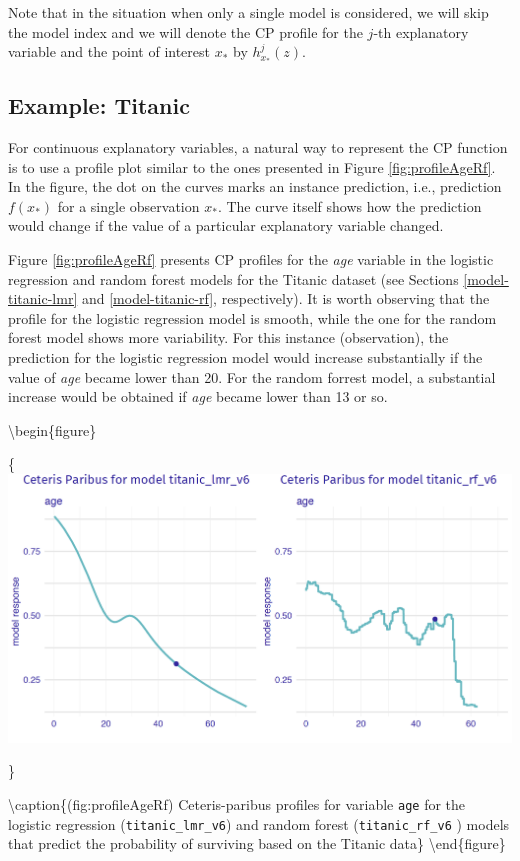 \documentclass[12pt,]{krantz}
\begin{document}
Note that in the situation when only a single model is considered, we will skip the model index and we will denote the CP profile for the \(j\)-th explanatory variable and the point of interest \(x_*\) by \(h^{j}_{x_*}(z)\).

\hypertarget{CPExample}{%
\subsection{Example: Titanic}\label{CPExample}}

For continuous explanatory variables, a natural way to represent the CP function is to use a profile plot similar to the ones presented in Figure \ref{fig:profileAgeRf}. In the figure, the dot on the curves marks an instance prediction, i.e., prediction \(f(x_*)\) for a single observation \(x_*\). The curve itself shows how the prediction would change if the value of a particular explanatory variable changed.

Figure \ref{fig:profileAgeRf} presents CP profiles for the \emph{age} variable in the logistic regression and random forest models for the Titanic dataset (see Sections \ref{model-titanic-lmr} and \ref{model-titanic-rf}, respectively). It is worth observing that the profile for the logistic regression model is smooth, while the one for the random forest model shows more variability. For this instance (observation), the prediction for the logistic regression model would increase substantially if the value of \emph{age} became lower than 20. For the random forrest model, a substantial increase would be obtained if \emph{age} became lower than 13 or so.

\textbackslash{}begin\{figure\}

\{\centering \includegraphics[width=0.7\linewidth]{figure/profile_age_rf}

\}

\textbackslash{}caption\{(fig:profileAgeRf) Ceteris-paribus profiles for variable \texttt{age} for the logistic regression (\texttt{titanic\_lmr\_v6}) and random forest (\texttt{titanic\_rf\_v6} ) models that predict the probability of surviving based on the Titanic data\}\label{fig:profileAgeRf}
\textbackslash{}end\{figure\}
\end{document}
